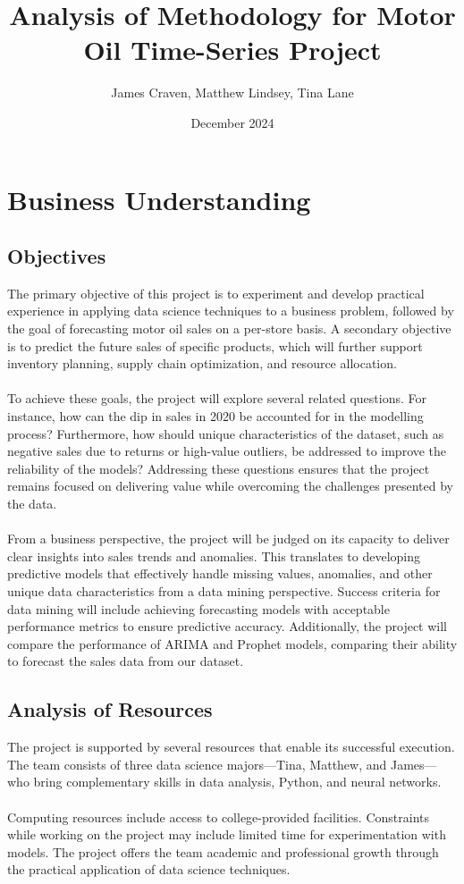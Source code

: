 \documentclass{article}
\title{Analysis of Methodology for Motor Oil Time-Series Project}
\author{James Craven, Matthew Lindsey, Tina Lane}
\date{December 2024}
\begin{document}
\maketitle

\section{Business Understanding}
    \subsection{Objectives}
        The primary objective of this project is to experiment and develop practical experience in applying 
        data science techniques to a business problem, followed by the goal of forecasting motor oil sales 
        on a per-store basis. A secondary objective is to predict the future sales of specific products, 
        which will further support inventory planning, supply chain optimization, and resource allocation. \\
        \\
        To achieve these goals, the project will explore several related questions. For instance, how can 
        the dip in sales in 2020 be accounted for in the modelling process? Furthermore, how should unique 
        characteristics of the dataset, such as negative sales due to returns or high-value outliers, be 
        addressed to improve the reliability of the models? Addressing these questions ensures that the 
        project remains focused on delivering value while overcoming the challenges presented by the data. \\
        \\
        From a business perspective, the project will be judged on its capacity to deliver clear insights 
        into sales trends and anomalies. This translates to developing predictive models that effectively 
        handle missing values, anomalies, and other unique data characteristics from a data mining 
        perspective. Success criteria for data mining will include achieving forecasting models with 
        acceptable performance metrics to ensure predictive accuracy. Additionally, the project will compare 
        the performance of ARIMA and Prophet models, comparing their ability to forecast the sales data from 
        our dataset.
    \subsection{Analysis of Resources}
        The project is supported by several resources that enable its successful execution. The team 
        consists of three data science majors—Tina, Matthew, and James—who bring complementary skills in 
        data analysis, Python, and neural networks. \\
        \\
        Computing resources include access to college-provided facilities. Constraints while working on the 
        project may include limited time for experimentation with models. The project offers the team 
        academic and professional growth through the practical application of data science techniques.
\end{document}
